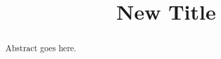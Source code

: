 \documentclass[conference]{IEEEtran}
\begin{document}
\title{New Title}
\author{\authors}

\maketitle

\begin{abstract}
  Abstract goes here.
\end{abstract}

\IEEEpeerreviewmaketitle







\end{document}
